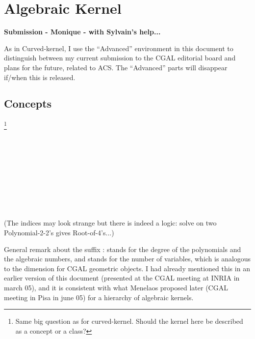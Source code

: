\chapter{Algebraic Kernel}

\textbf{Submission - Monique - with Sylvain's help...}

\begin{ccAdvanced}
As in Curved-kernel, I use the ``Advanced'' environment in this
document to distinguish between my current submission to the CGAL
editorial board and plans for the future, related to ACS. The
``Advanced'' parts will disappear if/when this is released.
\end{ccAdvanced}

\section*{Concepts}

\footnote{Same big question as for curved-kernel. Should the kernel here
be described as a concept or a class?}

\\
\\
\\
\\

\begin{ccAdvanced}
\\
\\
\\
\\

(The indices may look strange but there is indeed a logic: solve on two
Polynomial-2-2's gives Root-of-4's...)

General remark about the suffix :  stands 
for the degree of the polynomials and the algebraic numbers, and
 stands for the number of variables, which is analogous to the
dimension for CGAL geometric objects. I had already mentioned this in an
earlier version of this document (presented at the CGAL meeting at
INRIA in march 05), and it is consistent with what Menelaos proposed
later (CGAL meeting in Pisa in june 05) for a hierarchy of algebraic kernels.
\end{ccAdvanced}

